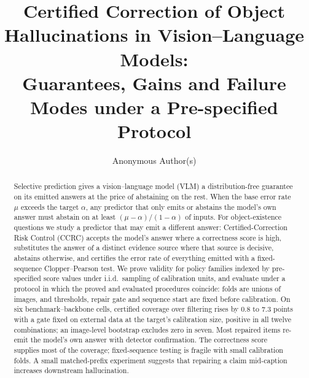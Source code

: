 \documentclass[11pt,a4paper]{article}
\title{Certified Correction of Object Hallucinations in Vision--Language Models:\\
Guarantees, Gains and Failure Modes under a Pre-specified Protocol}
\author{Anonymous Author(s)}
\date{}
\theoremstyle{plain}
\theoremstyle{definition}
\theoremstyle{remark}
\begin{document}
\maketitle

\begin{abstract}
Selective prediction gives a vision--language model (VLM) a distribution-free guarantee on its emitted answers
at the price of abstaining on the rest. When the base error rate $\mu$ exceeds the target $\alpha$, any
predictor that only emits or abstains the model's own answer must abstain on at least $(\mu-\alpha)/(1-\alpha)$ of
inputs. For object-existence questions we study a predictor that may emit a different answer: Certified-Correction Risk Control (CCRC) accepts the
model's answer where a correctness score is high, substitutes the answer of a distinct evidence source where that source is decisive, abstains otherwise, and certifies the error rate of
everything emitted with a fixed-sequence Clopper--Pearson test. We prove validity for policy families indexed by
pre-specified score values under i.i.d.\ sampling of calibration units, and evaluate under a protocol in which the
proved and evaluated procedures coincide: folds are unions of images, and thresholds, repair gate and sequence start
are fixed before calibration. On six benchmark--backbone cells, certified coverage over filtering rises by $0.8$ to $7.3$
points with a gate fixed on external data at the target's calibration size, positive in all twelve combinations; an image-level bootstrap excludes zero in seven. Most repaired items re-emit the model's own answer with
detector confirmation. The correctness score supplies most of the coverage; fixed-sequence testing is fragile with small calibration folds. A small matched-prefix experiment suggests that repairing a claim mid-caption increases downstream
hallucination.
\end{abstract}














\appendix

\end{document}

